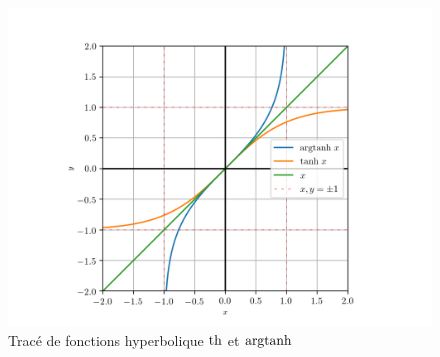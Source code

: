 %
\begin{figure}
  \centering
  \includegraphics[scale=0.6]{argtanh.png}
  \caption{Tracé de fonctions hyperbolique \(\operatorname{th}\) et \(\operatorname{argtanh}\)}
  \label{fig:tracetanhargth}
\end{figure}
\cleardoublepage
